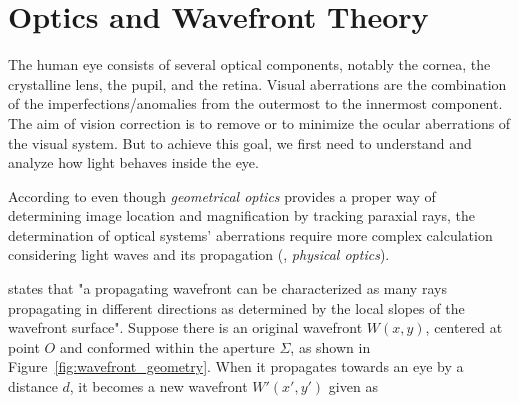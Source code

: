 
\section{Optics and Wavefront Theory}
\label{sec:OpticsAndWavefrontTheory}

The human eye consists of several optical components, notably the cornea, the crystalline lens, the pupil, and the retina. Visual aberrations are the combination of the imperfections/anomalies from the outermost  to the innermost  component. The aim of vision correction is to remove or to minimize the ocular aberrations of the visual system. But to achieve this goal, we first need to understand and analyze how light behaves inside the eye.

According to \citet{Sacek2015} even though \emph{geometrical optics} provides a proper way of determining image location and magnification by tracking paraxial rays, the determination of optical systems' aberrations require more complex calculation considering light waves and its propagation (\ie, \emph{physical optics}).

%
%
%


\citet{Dai2008} states that "a propagating wavefront can be characterized as many rays propagating in different directions as determined by the local slopes of the wavefront surface". Suppose there is an original wavefront $W(x,y)$, centered at point $O$ and conformed within the aperture $\Sigma$, as shown in Figure~\ref{fig:wavefront_geometry}. When it propagates towards an eye by a distance $d$, it becomes a new wavefront $W'(x',y')$ given as

